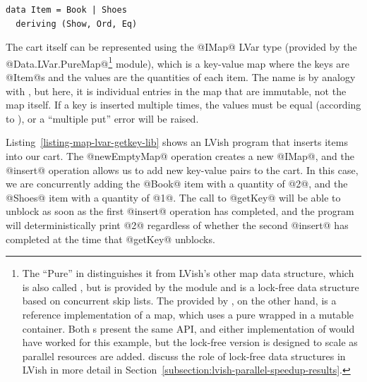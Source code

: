 \singlespacing
\begin{lstlisting}
data Item = Book | Shoes
  deriving (Show, Ord, Eq)
\end{lstlisting}
\doublespacing

\noindent The cart itself can be represented using the @IMap@ LVar
type (provided by the @Data.LVar.PureMap@\footnote{The ``Pure'' in
   distinguishes it from LVish's other map data
  structure, which is also called , but is provided by the
   module and is a lock-free data structure based
  on concurrent skip lists.  The  provided by
  , on the other hand, is a reference
  implementation of a map, which uses a pure  wrapped in
  a mutable container.  Both s present the same API, and
  either implementation of  would have worked for this
  example, but the lock-free version is designed to scale as parallel
  resources are added.   discuss the role of lock-free
  data structures in LVish in more detail in
  Section~\ref{subsection:lvish-parallel-speedup-results}.} module),
which is a key-value map where the keys are @Item@s and the values are
the quantities of each item.  The name  is by analogy with
, but here, it is individual entries in the map that are
immutable, not the map itself.  If a key is inserted multiple times,
the values must be equal (according to \il{==}), or a ``multiple put''
error will be raised.

\singlespacing

\doublespacing

Listing~\ref{listing-map-lvar-getkey-lib} shows an LVish program that
inserts items into our cart.  The @newEmptyMap@ operation creates a
new @IMap@, and the @insert@ operation allows us to add new key-value
pairs to the cart.  In this case, we are concurrently adding the
@Book@ item with a quantity of @2@, and the @Shoes@ item with a
quantity of @1@.  The call to @getKey@ will be able to unblock as soon
as the first @insert@ operation has completed, and the program will
deterministically print @2@ regardless of whether the second @insert@
has completed at the time that @getKey@ unblocks.

